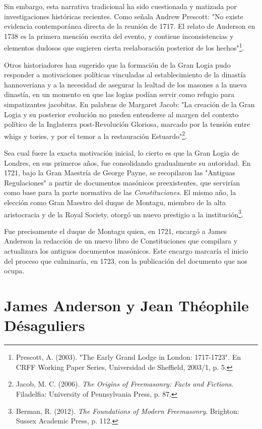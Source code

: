 \documentclass[a4paper,12pt,twoside]{book}
\begin{document}
Sin embargo, esta narrativa tradicional ha sido cuestionada y matizada por investigaciones históricas recientes. Como señala Andrew Prescott: "No existe evidencia contemporánea directa de la reunión de 1717. El relato de Anderson en 1738 es la primera mención escrita del evento, y contiene inconsistencias y elementos dudosos que sugieren cierta reelaboración posterior de los hechos"\footnote{Prescott, A. (2003). "The Early Grand Lodge in London: 1717-1723". En CRFF Working Paper Series, Universidad de Sheffield, 2003/1, p. 5.}.

Otros historiadores han sugerido que la formación de la Gran Logia pudo responder a motivaciones políticas vinculadas al establecimiento de la dinastía hannoveriana y a la necesidad de asegurar la lealtad de los masones a la nueva dinastía, en un momento en que las logias podían servir como refugio para simpatizantes jacobitas. En palabras de Margaret Jacob: "La creación de la Gran Logia y su posterior evolución no pueden entenderse al margen del contexto político de la Inglaterra post-Revolución Gloriosa, marcado por la tensión entre whigs y tories, y por el temor a la restauración Estuardo"\footnote{Jacob, M. C. (2006). \textit{The Origins of Freemasonry: Facts and Fictions}. Filadelfia: University of Pennsylvania Press, p. 87.}.

Sea cual fuere la exacta motivación inicial, lo cierto es que la Gran Logia de Londres, en sus primeros años, fue consolidando gradualmente su autoridad. En 1721, bajo la Gran Maestría de George Payne, se recopilaron las "Antiguas Regulaciones" a partir de documentos masónicos preexistentes, que servirían como base para la parte normativa de las \textit{Constituciones}. El mismo año, la elección como Gran Maestro del duque de Montagu, miembro de la alta aristocracia y de la Royal Society, otorgó un nuevo prestigio a la institución\footnote{Berman, R. (2012). \textit{The Foundations of Modern Freemasonry}. Brighton: Sussex Academic Press, p. 112.}.

Fue precisamente el duque de Montagu quien, en 1721, encargó a James Anderson la redacción de un nuevo libro de Constituciones que compilara y actualizara los antiguos documentos masónicos. Este encargo marcaría el inicio del proceso que culminaría, en 1723, con la publicación del documento que nos ocupa.

\section{James Anderson y Jean Théophile Désaguliers}
\end{document}
